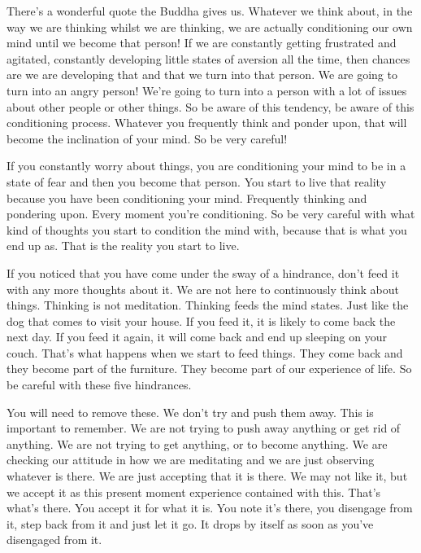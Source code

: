 \documentclass[letterpaper,10pt,english]{sphinxmanual}
\begin{document}
\sphinxAtStartPar
There’s a wonderful quote the Buddha gives us.
Whatever we think about, in the way we are thinking whilst we are
thinking, we are actually conditioning our own mind until we become that
person! If we are constantly getting frustrated and agitated, constantly developing little states of aversion all the time, then chances are we are developing that and that we turn into that person. We are going to turn into an angry
person! We’re  going  to  turn  into  a  person  with  a  lot  of  issues  about  other
people or other things. So be aware of this tendency, be aware of this conditioning process. Whatever you frequently think and ponder upon, that will
become the inclination of your mind. So be very careful!

\sphinxAtStartPar
If you constantly worry about things, you are conditioning your mind
to be in a state of fear and then you become that person. You start to live that
reality because you have been conditioning your mind. Frequently thinking
and pondering upon. Every moment you’re conditioning. So be very careful
with what kind of thoughts you start to condition the mind with, because that
is what you end up as. That is the reality you start to live.

\sphinxAtStartPar
If you noticed that you have come under the sway of a hindrance, don’t
feed  it  with  any  more  thoughts  about  it.  We  are  not  here  to  continuously
think  about  things.  Thinking  is  not  meditation.  Thinking  feeds  the  mind
states. Just like the dog that comes to visit your house. If you feed it, it is
likely to come back the next day. If you feed it again, it will come back and
end up sleeping on your couch. That’s what happens when we start to feed
things. They come back and they become part of the furniture. They become
part of our experience of life. So be careful with these five hindrances.

\sphinxAtStartPar
{}
You will need
to  remove  these.  We  don’t  try  and  push  them  away.  This  is  important  to
remember. We are not trying to push away anything or get rid of anything.
We are not trying to get anything, or to become anything. We are checking
  our attitude in how we are meditating and we are just observing whatever is
there. We are just accepting that it is there. We may not like it, but we accept
it as this present moment experience contained with this. That’s what’s there.
You accept it for what it is. You note it’s there, you disengage from it, step
back from it and just let it go. It drops by itself as soon as you’ve disengaged
from it.
\end{document}
